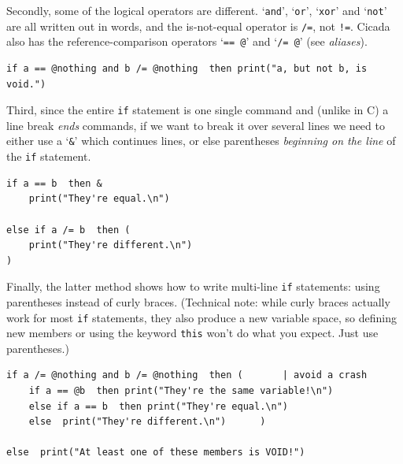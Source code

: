\documentclass{article}
\newenvironment{code}{
       \begin{list}{}{
               \setlength{\leftmargin}{.4in}
               \setlength{\rightmargin}{0in}
               \setlength{\topsep}{.2in}
       }
       \small
       \item[] }
       { \end{list}   }
\begin{document}
\noindent Secondly, some of the logical operators are different.  `\verb#and#', `\verb#or#', `\verb#xor#' and `\verb#not#' are all written out in words, and the is-not-equal operator is \verb#/=#, not \verb#!=#.  Cicada also has the reference-comparison operators `\verb#== @#' and `\verb#/= @#' (see \emph{aliases}).

\begin{code} \begin{verbatim}
if a == @nothing and b /= @nothing  then print("a, but not b, is void.")
\end{verbatim} \end{code}

\noindent Third, since the entire \verb#if# statement is one single command and (unlike in C) a line break \emph{ends} commands, if we want to break it over several lines we need to either use a `\verb#&#' which continues lines, or else parentheses \emph{beginning on the line} of the \verb#if# statement.

\begin{code} \begin{verbatim}
if a == b  then &
    print("They're equal.\n")

else if a /= b  then (
    print("They're different.\n")
)
\end{verbatim} \end{code}

\noindent Finally, the latter method shows how to write multi-line \verb#if# statements:  using parentheses instead of curly braces.  (Technical note:  while curly braces actually work for most \verb#if# statements, they also produce a new variable space, so defining new members or using the keyword \verb#this# won't do what you expect.  Just use parentheses.)

\begin{code} \begin{verbatim}
if a /= @nothing and b /= @nothing  then (       | avoid a crash
    if a == @b  then print("They're the same variable!\n")
    else if a == b  then print("They're equal.\n")
    else  print("They're different.\n")      )

else  print("At least one of these members is VOID!")
\end{verbatim} \end{code}

\end{document}
